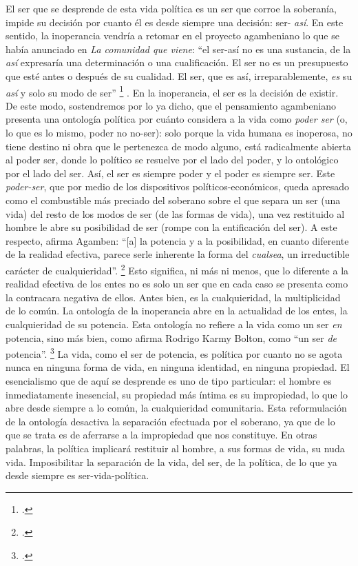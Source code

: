 El ser que se desprende de esta vida política es un ser que corroe la soberanía, impide su decisión por cuanto él es desde siempre una decisión: ser- \emph{así}. En este sentido, la inoperancia vendría a retomar en el proyecto agambeniano lo que se había anunciado en \emph{La comunidad que viene}: \enquote{el ser-así no es una sustancia, de la \emph{así} expresaría una determinación o una cualificación. El ser no es un presupuesto que esté antes o después de su cualidad. El ser, que es así, irreparablemente, \emph{es} su \emph{así} y solo su modo de ser} \footcite[][81]{@7094-AGAMBEN2003}
. En la inoperancia, el ser es la decisión de existir. De este modo, sostendremos por lo ya dicho, que el pensamiento agambeniano presenta una ontología política por cuánto considera a la vida como \emph{poder ser} (o, lo que es lo mismo, poder no no-ser): solo porque la vida humana es inoperosa, no tiene destino ni obra que le pertenezca de modo alguno, está radicalmente abierta al poder ser, donde lo político se resuelve por el lado del poder, y lo ontológico por el lado del ser. Así, el ser es siempre poder y el poder es siempre ser. Este \emph{poder-ser}, que por medio de los dispositivos políticos-económicos, queda apresado como el combustible más preciado del soberano sobre el que separa un ser (una vida) del resto de los modos de ser (de las formas de vida), una vez restituido al hombre le abre su posibilidad de ser (rompe con la entificación del ser). A este respecto, afirma Agamben: \enquote{{[}a{]} la potencia y a la posibilidad, en cuanto diferente de la realidad efectiva, parece serle inherente la forma del \emph{cualsea}, un irreductible carácter de cualquieridad}. \footcite[][37]{@7094-AGAMBEN2003} Esto significa, ni más ni menos, que lo diferente a la realidad efectiva de los entes no es solo un ser que en cada caso se presenta como la contracara negativa de ellos. Antes bien, es la cualquieridad, la multiplicidad de lo común. La ontología de la inoperancia abre en la actualidad de los entes, la cualquieridad de su potencia. Esta ontología no refiere a la vida como un ser \emph{en} potencia, sino más bien, como afirma Rodrigo Karmy Bolton, como \enquote{un ser \emph{de} potencia}. \footcite[][9]{@7089-KARMYBOLTON2010} La vida, como el ser de potencia, es política por cuanto no se agota nunca en ninguna forma de vida, en ninguna identidad, en ninguna propiedad. El esencialismo que de aquí se desprende es uno de tipo particular: el hombre es inmediatamente inesencial, su propiedad más íntima es su impropiedad, lo que lo abre desde siempre a lo común, la cualquieridad comunitaria. Esta reformulación de la ontología desactiva la separación efectuada por el soberano, ya que de lo que se trata es de aferrarse a la impropiedad que nos constituye. En otras palabras, la política implicará restituir al hombre, a sus formas de vida, su nuda vida. Imposibilitar la separación de la vida, del ser, de la política, de lo que ya desde siempre es ser-vida-política.

